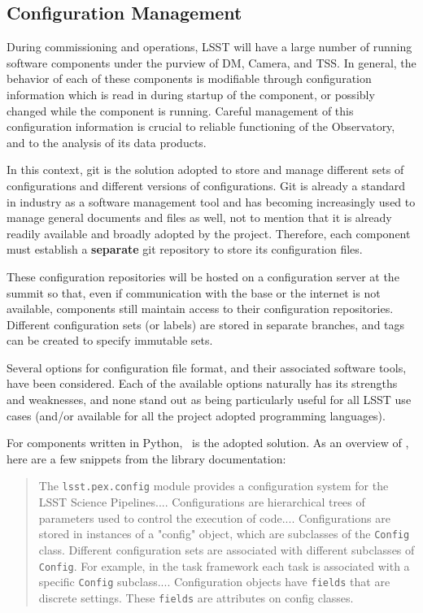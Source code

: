 \subsection{Configuration Management}\label{sect:config}
During commissioning and operations, LSST will have a large number of running software components under the purview of DM, Camera, and TSS. In general, the behavior of each of these components is modifiable through configuration information which is read in during startup of the component, or possibly changed while the component is running. Careful management of this configuration information is crucial to reliable functioning of the Observatory, and to the analysis of its data products.

In this context, git is the solution adopted to store and manage different sets of configurations and different versions of configurations. Git is already a standard in industry as a software management tool and has becoming increasingly used to manage general documents and files as well, not to mention that it is already readily available and broadly adopted by the project. Therefore, each component must establish a {\bf separate} git repository to store its configuration files.

These configuration repositories will be hosted on a configuration server at the summit so that, even if communication with the base or the internet is not available, components still maintain access to their configuration repositories. Different configuration sets (or labels) are stored in separate branches, and tags can be created to specify immutable sets.

Several options for configuration file format, and their associated software tools, have been considered. Each of the available options naturally has its strengths and weaknesses, and none stand out as being particularly useful for all LSST use cases (and/or available for all the project adopted programming languages).

For components written in Python, \pexC~is the adopted solution. As an overview of \pexC, here are a few snippets from the library documentation:

\begin{quotation}
The \texttt{lsst.pex.config} module provides a configuration system for the LSST Science Pipelines.... Configurations are hierarchical trees of parameters used to control the execution of code.... Configurations are stored in instances of a "config" object, which are subclasses of the \texttt{Config} class. Different configuration sets are associated with different subclasses of \texttt{Config}. For example, in the task framework each task is associated with a specific \texttt{Config} subclass.... Configuration objects have \texttt{fields} that are discrete settings. These \texttt{fields} are attributes on config classes.
\end{quotation}

